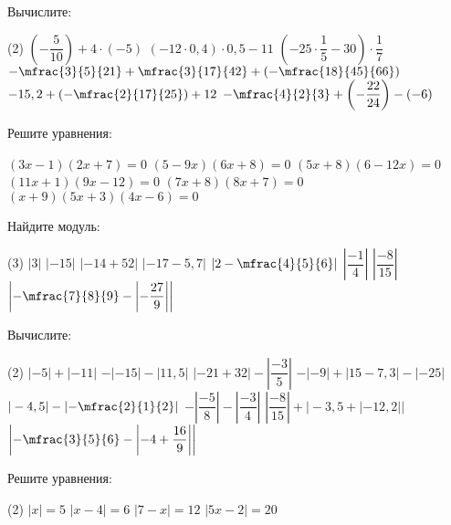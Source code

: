 \begin{class}[number=4]
	\begin{listofex}
		\item Вычислите:
		\begin{tasks}(2)
			\task \( \left( -\dfrac{ 5 }{ 10 } \right)+4 \cdot (-5) \)
			\task \( (-12 \cdot 0,4) \cdot 0,5 - 11 \)
			\task \( (-25 \cdot \dfrac{ 1 }{ 5 } - 30) \cdot \dfrac{ 1 }{ 7 } \)
			\task \( -\mfrac{3}{5}{21}+\mfrac{3}{17}{42}+\left(-\mfrac{18}{45}{66}\right) \)
			\task \( -15,2 + \left(-\mfrac{2}{17}{25}\right) + 12 \)
			\task \( -\mfrac{4}{2}{3} + \left(-\dfrac{22}{24}\right) - (-6) \)
		\end{tasks}
		\item Решите уравнения: %
		\begin{tasks}
			\task \( (3x-1)(2x+7)=0 \)
			\task \( (5-9x)(6x+8)=0 \)
			\task \( (5x+8)(6-12x)=0 \)
			\task \( (11x+1)(9x-12)=0 \)
			\task \( (7x+8)(8x+7)=0 \)
			\task \( (x+9)(5x+3)(4x-6)=0 \)
		\end{tasks}
		\item Найдите модуль:
		\begin{tasks}(3)
			\task \(  |3| \)
			\task \(  |-15| \)
			\task \( |-14+52|  \)
			\task \( |-17-5,7|  \)
			\task \(  \left|2-\mfrac{4}{5}{6}\right| \)
			\task \(  \left|\dfrac{-1}{4}\right| \)
			\task \(  \left|\dfrac{-8}{15}\right| \)
			\task \(  \left|-\mfrac{7}{8}{9} - \left|-\dfrac{27}{9}\right|\right| \)
		\end{tasks}
		\item Вычислите:
		\begin{tasks}(2)
			\task \(  |-5|+|-11| \)
			\task \(  -|-15|-|11,5| \)
			\task \( |-21+32| - \left|\dfrac{-3}{5}\right|  \)
			\task \( -|-9|+|15-7,3|-|-25|  \)
			\task \(  |-4,5|-\left|-\mfrac{2}{1}{2}\right| \)
			\task \(  -\left| \dfrac{-5}{8} \right|-\left|\dfrac{-3}{4}\right| \)
			\task \(  \left|\dfrac{-8}{15}\right| + \bigl|-3,5+|-12,2|| \)
			\task \(  \left|-\mfrac{3}{5}{6} - \left|-4+\dfrac{16}{9}\right|\right| \)
		\end{tasks}
		\item Решите уравнения:
		\begin{tasks}(2)
			\task \( |x|=5 \)
			\task \( |x-4|=6 \)
			\task \( |7-x|=12 \)
			\task \( |5x-2|=20 \)
		\end{tasks}
	\end{listofex}
\end{class}

